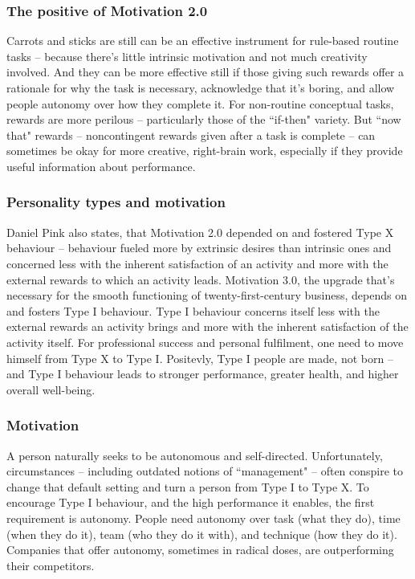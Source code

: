 \subsubsection{The positive of Motivation 2.0}
Carrots and sticks are still can be an effective instrument for rule-based routine tasks -- because there’s little intrinsic motivation and not much creativity involved. And they can be more effective still if those giving such rewards offer a rationale for why the task is necessary, acknowledge that it’s boring, and allow people autonomy over how they complete it.
For non-routine conceptual tasks, rewards are more perilous -- particularly those of the ``if-then" variety. But ``now that" rewards -- noncontingent rewards given after a task is complete -- can sometimes be okay for more creative, right-brain work, especially if they provide useful information about performance.

\subsubsection{Personality types and motivation}
Daniel Pink also states, that Motivation 2.0 depended on and fostered Type X behaviour -- behaviour fueled more by extrinsic desires than intrinsic ones and concerned less with the inherent satisfaction of an activity and more with the external rewards to which an activity leads. Motivation 3.0, the upgrade that’s necessary for the smooth functioning of twenty-first-century business, depends on and fosters Type I behaviour. Type I behaviour concerns itself less with the external rewards an activity brings and more with the inherent satisfaction of the activity itself. For professional success and personal fulfilment, one need to move himself from Type X to Type I. Positevly, Type I people are made, not born -- and Type I behaviour leads to stronger performance, greater health, and higher overall well-being.

\subsubsection{Motivation}
A person naturally seeks to be autonomous and self-directed. Unfortunately, circumstances -- including outdated notions of ``management" -- often conspire to change that default setting and turn a person from Type I to Type X. To encourage Type I behaviour, and the high performance it enables, the first requirement is autonomy. People need autonomy over task (what they do), time (when they do it), team (who they do it with), and technique (how they do it). Companies that offer autonomy, sometimes in radical doses, are outperforming their competitors.

